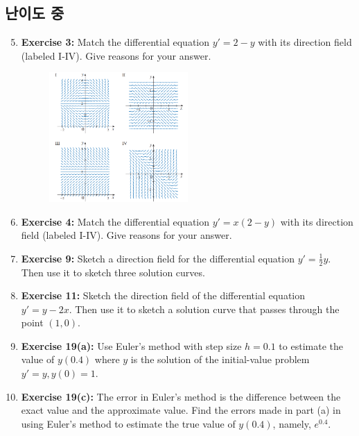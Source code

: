 \documentclass[12pt, a4paper]{article}
\begin{document}
\subsection*{난이도 중 }
\begin{enumerate}
    \setcounter{enumi}{4} %
    \item \textbf{Exercise 3:} Match the differential equation $y' = 2 - y$ with its direction field (labeled I-IV). Give reasons for your answer.
    
     \begin{figure}[htbp]
        \centering
        \includegraphics[width=0.5\textwidth]{graph2.png} %
    \end{figure}


    \item \textbf{Exercise 4:} Match the differential equation $y' = x(2 - y)$ with its direction field (labeled I-IV). Give reasons for your answer.

    \item \textbf{Exercise 9:} Sketch a direction field for the differential equation $y' = \frac{1}{2}y$. Then use it to sketch three solution curves.

    \item \textbf{Exercise 11:} Sketch the direction field of the differential equation $y' = y - 2x$. Then use it to sketch a solution curve that passes through the point $(1,0)$.

    \item \textbf{Exercise 19(a):} Use Euler's method with step size $h=0.1$ to estimate the value of $y(0.4)$ where $y$ is the solution of the initial-value problem $y' = y, y(0)=1$.

    \item \textbf{Exercise 19(c):} The error in Euler's method is the difference between the exact value and the approximate value. Find the errors made in part (a) in using Euler's method to estimate the true value of $y(0.4)$, namely, $e^{0.4}$.


\end{enumerate}
\end{document}
